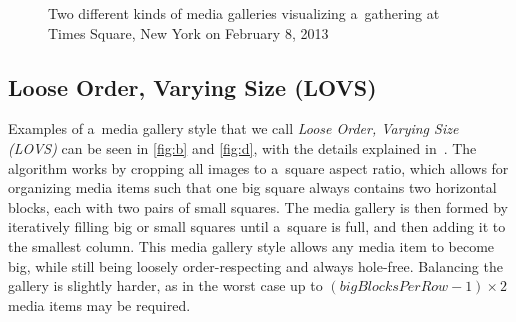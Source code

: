 \documentclass{sig-alt-release2}
\begin{document}
\begin{figure}[t!]
  \centering
  \caption{Two different kinds of media galleries visualizing a~gathering at Times Square, New York on February 8, 2013}
  \label{fig:media-gallery}  
\end{figure}

\subsection{Loose Order, Varying Size (LOVS)}

Examples of a~media gallery style
that we call \emph{Loose Order, Varying Size (LOVS)}
can be seen in \autoref{fig:b} and \autoref{fig:d},
with the details explained in~\cite{chedeau2012facebook}.
The algorithm works by cropping all images to a~square aspect ratio,
which allows for organizing media items such that one big square always
contains two horizontal blocks, each with two pairs of small squares.
The media gallery is then formed by iteratively filling
big or small squares until a~square is full,
and then adding it to the smallest column.
This media gallery style allows any media item to become big,
while still being loosely order-respecting and always hole-free.
Balancing the gallery is slightly harder,
as in the worst case up to $ (\mathit{bigBlocksPerRow} - 1) \times 2 $
media items may be required.
\end{document}
